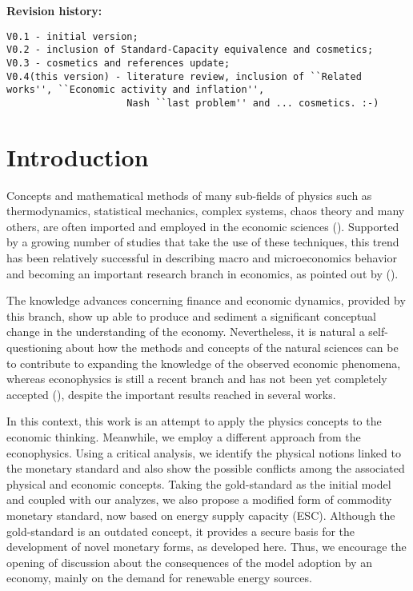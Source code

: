 \documentclass[11pt]{article}
\begin{document}
\noindent\textbf{Revision history:}
\begin{Verbatim}[fontsize=\scriptsize]
V0.1 - initial version;
V0.2 - inclusion of Standard-Capacity equivalence and cosmetics;
V0.3 - cosmetics and references update;
V0.4(this version) - literature review, inclusion of ``Related works'', ``Economic activity and inflation'',
                     Nash ``last problem'' and ... cosmetics. :-)
\end{Verbatim}
\clearpage

\section{Introduction} \label{Introduction}

Concepts and mathematical methods of many sub-fields of physics such as thermodynamics, statistical mechanics, complex systems, chaos 
theory and many others, are often imported and employed in the economic sciences (\citealt{ECONOFISICA2}). Supported by a growing number of 
studies that take the use of these techniques, this trend has been relatively successful in describing macro and microeconomics behavior and 
becoming an important research branch in economics, as pointed out by (\citealt{ECONOFISICA1}).

The knowledge advances concerning finance and economic dynamics, provided by this branch, show up able to produce and sediment a 
significant conceptual change in the understanding of the economy. Nevertheless, it is natural a self-questioning about how the methods and 
concepts of the natural sciences can be to contribute to expanding the knowledge of the observed economic phenomena, whereas econophysics is 
still a recent branch and has not been yet completely accepted (\citealt{ECONOFISICA0, ECONOFISICA6}), despite the important results 
reached in several works.

In this context, this work is an attempt to apply the physics concepts to the economic thinking. Meanwhile, we employ a different approach 
from the econophysics. Using a critical analysis, we identify the physical notions linked to the monetary standard and also show the 
possible conflicts among the associated physical and economic concepts. Taking the gold-standard as the initial model and coupled with our 
analyzes, we also propose a modified form of commodity monetary standard, now based on energy supply capacity (ESC). Although the 
gold-standard is an outdated concept, it provides a secure basis for the development of novel monetary forms, as developed here. Thus, we 
encourage the opening of discussion about the consequences of the model adoption by an economy, mainly on the demand for renewable energy 
sources.
\end{document}
